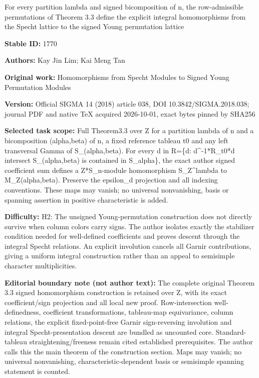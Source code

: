 \documentclass[11pt]{article}
\begin{document}
\begin{center}\Large For every partition lambda and signed bicomposition of n, the row-admissible permutations of Theorem 3.3 define the explicit integral homomorphisms from the Specht lattice to the signed Young permutation lattice\end{center}
\noindent\textbf{Stable ID:} 1770\par
\noindent\textbf{Authors:} Kay Jin Lim; Kai Meng Tan\par
\noindent\textbf{Original work:} Homomorphisms from Specht Modules to Signed Young Permutation Modules\par
\noindent\textbf{Version:} Official SIGMA 14 (2018) article 038, DOI 10.3842/SIGMA.2018.038; journal PDF and native TeX acquired 2026-10-01, exact bytes pinned by SHA256\par
\noindent\textbf{Selected task scope:} Full Theorem3.3 over Z for a partition lambda of n and a bicomposition (alpha,beta) of n, a fixed reference tableau t0 and any left transversal Gamma of S\_(alpha,beta). For every d in R=\{d: d\textasciicircum{}-1*R\_t0*d intersect S\_(alpha,beta) is contained in S\_alpha\}, the exact author signed coefficient sum defines a Z*S\_n-module homomorphism S\_Z\textasciicircum{}lambda to M\_Z(alpha,beta). Preserve the epsilon\_d projection and all indexing conventions. These maps may vanish; no universal nonvanishing, basis or spanning assertion in positive characteristic is added.\par
\noindent\textbf{Difficulty:} H2: The unsigned Young-permutation construction does not directly survive when column colors carry signs. The author isolates exactly the stabilizer condition needed for well-defined coefficients and proves descent through the integral Specht relations. An explicit involution cancels all Garnir contributions, giving a uniform integral construction rather than an appeal to semisimple character multiplicities.\par
\noindent\textbf{Editorial boundary note (not author text):} The complete original Theorem 3.3 signed homomorphism construction is retained over Z, with its exact coefficient/sign projection and all local new proof. Row-intersection well-definedness, coefficient transformations, tableau-map equivariance, column relations, the explicit fixed-point-free Garnir sign-reversing involution and integral Specht-presentation descent are bundled as uncounted core. Standard-tableau straightening/freeness remain cited established prerequisites. The author calls this the main theorem of the construction section. Maps may vanish; no universal nonvanishing, characteristic-dependent basis or semisimple spanning statement is counted.\par
\end{document}
